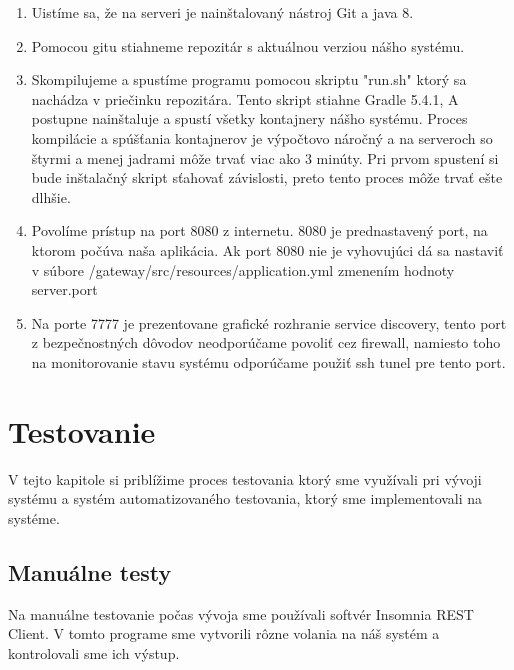 \begin{enumerate}
    \item Uistíme sa, že na serveri je nainštalovaný nástroj Git a java 8.
	\item Pomocou gitu stiahneme repozitár \cite{dp_repo} s aktuálnou verziou nášho systému.
    \item Skompilujeme a spustíme programu pomocou skriptu "run.sh" ktorý sa nachádza v priečinku repozitára. Tento skript stiahne Gradle 5.4.1, A postupne nainštaluje a spustí všetky kontajnery nášho systému.
	Proces kompilácie a spúšťania kontajnerov je výpočtovo náročný a na serveroch so štyrmi a menej jadrami môže trvať viac ako 3 minúty. Pri prvom spustení si bude inštalačný skript sťahovať závislosti, preto tento proces môže trvať ešte dlhšie.
    \item Povolíme prístup na port 8080 z internetu. 8080 je prednastavený port, na ktorom počúva naša aplikácia. Ak port 8080 nie je vyhovujúci dá sa nastaviť v súbore /gateway/src/resources/application.yml zmenením hodnoty server.port
    \item Na porte 7777 je prezentovane grafické rozhranie service discovery, tento port z bezpečnostných dôvodov neodporúčame povoliť cez firewall, namiesto toho na monitorovanie stavu systému odporúčame použiť ssh tunel pre tento port.
\end{enumerate}

\section{Testovanie}
V tejto kapitole si priblížime proces testovania ktorý sme využívali pri vývoji systému a systém automatizovaného testovania, ktorý sme implementovali na systéme.

\subsection{Manuálne testy}

Na manuálne testovanie počas vývoja sme používali softvér Insomnia REST Client\cite{insomnia}. V tomto programe sme vytvorili rôzne volania na náš systém a kontrolovali sme ich výstup.

